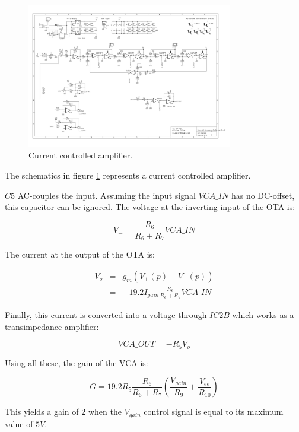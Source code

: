 \documentclass[a4paper,11pt]{article}
\begin{document}
\begin{figure}
\centering
\includegraphics[width=0.8\textwidth]{smr4mkII_vca.pdf}
\caption{Current controlled amplifier.}
\label{fig:vca}
\end{figure}

The schematics in figure \ref{fig:vca} represents a current controlled amplifier.

$C5$ AC-couples the input. Assuming the input signal $VCA\_IN$ has no DC-offset, this capacitor can be ignored. The voltage at the inverting input of the OTA is:

\begin{equation}
V_- = \frac{R_6}{R_6 + R_7} VCA\_IN
\end{equation}

The current at the output of the OTA is:

\begin{eqnarray}
V_o &=& g_m (V_+(p) - V_-(p)) \\
 &=& -19.2 I_{gain} \frac{R_6}{R_6 + R_7} VCA\_IN
\end{eqnarray}

Finally, this current is converted into a voltage through $IC2B$ which works as a transimpedance amplifier:

\begin{equation}
VCA\_OUT = -R_5 V_o
\end{equation}

Using all these, the gain of the VCA is:

\begin{equation}
G = 19.2 R_5 \frac{R_6}{R_6 + R_7} \left(\frac{V_{gain}}{R_9} + \frac{V_{ee}}{R_{10}}\right)
\end{equation}

This yields a gain of $2$ when the $V_{gain}$ control signal is equal to its maximum value of $5V$.
\end{document}
